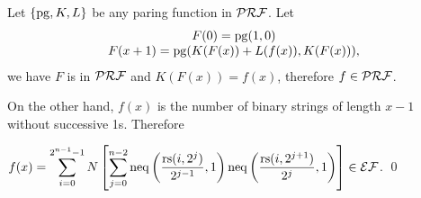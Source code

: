 \begin{pf} \rm
  Let $\{\mathrm{pg}, K, L\}$ be any paring function in $\mathcal{PRF}$. Let
\[
\begin{array}{c}
F(0) = \mathrm{pg}( 1, 0 ) \\
F(x + 1) = \mathrm{pg}(K(F(x)) + L(f(x)),  K(F(x))),
\end{array}
\]
we have $F$ is in $\mathcal{PRF}$ and $K(F(x)) = f(x)$, therefore $f\in\mathcal{PRF}$. 

On the other hand, 
$f(x)$ is the number of binary strings of length $x-1$ without successive 1s. Therefore

\noindent $\displaystyle f(x) = \sum_{i=0}^{ 2^{n-1}-1} N\left[ \sum_{j = 0}^{n - 2}
\mathrm{neq} \left( \frac{\mathrm{rs}(i, 2^j)}{2^{j - 1}} , 1  \right)
\mathrm{neq} \left( \frac{\mathrm{rs}(i, 2^{j+1})}{2^{j}} , 1  \right) \right]
\in\mathcal{EF}$.
\qed
\end{pf}

